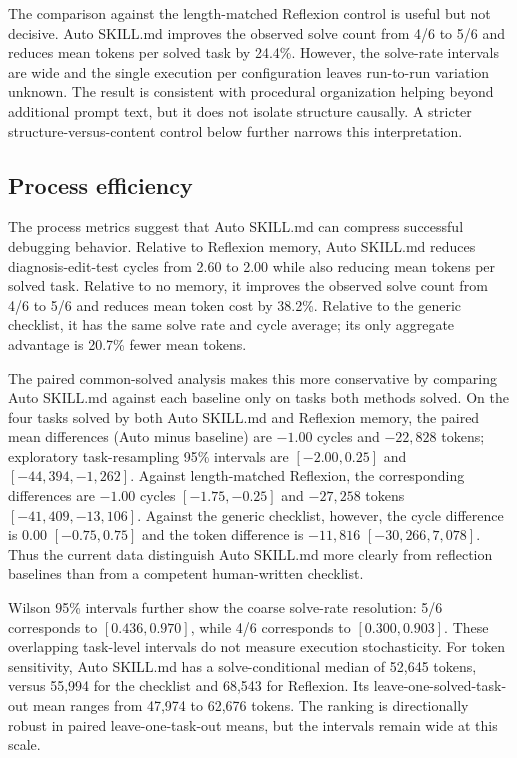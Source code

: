 The comparison against the length-matched Reflexion control is useful but not decisive. Auto SKILL.md improves the observed solve count from 4/6 to 5/6 and reduces mean tokens per solved task by 24.4\%. However, the solve-rate intervals are wide and the single execution per configuration leaves run-to-run variation unknown. The result is consistent with procedural organization helping beyond additional prompt text, but it does not isolate structure causally. A stricter structure-versus-content control below further narrows this interpretation.

\FloatBarrier
\subsection{Process efficiency}
\label{sec:results_efficiency}

The process metrics suggest that Auto SKILL.md can compress successful debugging behavior. Relative to Reflexion memory, Auto SKILL.md reduces diagnosis-edit-test cycles from 2.60 to 2.00 while also reducing mean tokens per solved task. Relative to no memory, it improves the observed solve count from 4/6 to 5/6 and reduces mean token cost by 38.2\%. Relative to the generic checklist, it has the same solve rate and cycle average; its only aggregate advantage is 20.7\% fewer mean tokens.

The paired common-solved analysis makes this more conservative by comparing Auto SKILL.md against each baseline only on tasks both methods solved. On the four tasks solved by both Auto SKILL.md and Reflexion memory, the paired mean differences (Auto minus baseline) are $-1.00$ cycles and $-22{,}828$ tokens; exploratory task-resampling 95\% intervals are $[-2.00,0.25]$ and $[-44{,}394,-1{,}262]$. Against length-matched Reflexion, the corresponding differences are $-1.00$ cycles $[-1.75,-0.25]$ and $-27{,}258$ tokens $[-41{,}409,-13{,}106]$. Against the generic checklist, however, the cycle difference is $0.00$ $[-0.75,0.75]$ and the token difference is $-11{,}816$ $[-30{,}266,7{,}078]$. Thus the current data distinguish Auto SKILL.md more clearly from reflection baselines than from a competent human-written checklist.

Wilson 95\% intervals further show the coarse solve-rate resolution: 5/6 corresponds to $[0.436,0.970]$, while 4/6 corresponds to $[0.300,0.903]$. These overlapping task-level intervals do not measure execution stochasticity. For token sensitivity, Auto SKILL.md has a solve-conditional median of 52,645 tokens, versus 55,994 for the checklist and 68,543 for Reflexion. Its leave-one-solved-task-out mean ranges from 47,974 to 62,676 tokens. The ranking is directionally robust in paired leave-one-task-out means, but the intervals remain wide at this scale.

